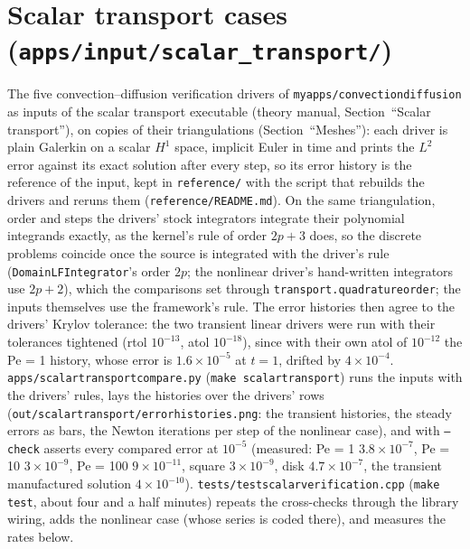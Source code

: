 \documentclass[11pt]{article}
\DeclareRobustCommand{\code}[1]{{\def\_{\textunderscore\allowbreak}\texttt{#1}}}
\DeclareRobustCommand{\file}[1]{{\def\_{\textunderscore\allowbreak}\texttt{#1}}}
\begin{document}
\section{Scalar transport cases (\texttt{apps/input/scalar\_transport/})}
\label{sec:scalarcases}

The five convection--diffusion verification drivers of
\file{myapps/convection\_diffusion} as inputs of the scalar transport
executable (theory manual, Section~``Scalar transport''), on copies of
their triangulations (Section~``Meshes''): each driver is plain Galerkin on
a scalar $H^1$ space, implicit Euler in time and prints the $L^2$ error
against its exact solution after every step, so its error history is the
reference of the input, kept in \file{reference/} with the script that
rebuilds the drivers and reruns them (\file{reference/README.md}).  On the
same triangulation, order and steps the drivers' stock integrators
integrate their polynomial integrands exactly, as the kernel's rule of
order $2p + 3$ does, so the discrete problems coincide once the source is
integrated with the driver's rule (\code{DomainLFIntegrator}'s order $2p$;
the nonlinear driver's hand-written integrators use $2p + 2$), which the
comparisons set through \code{transport.quadrature\_order}; the inputs
themselves use the framework's rule.  The error histories then agree to the
drivers' Krylov tolerance: the two transient linear drivers were run with
their tolerances tightened (rtol $10^{-13}$, atol $10^{-18}$), since with
their own atol of $10^{-12}$ the Pe = 1 history, whose error is
$1.6\times10^{-5}$ at $t = 1$, drifted by $4\times10^{-4}$.
\file{apps/scalar\_transport\_compare.py} (\code{make scalar\_transport})
runs the inputs with the drivers' rules, lays the histories over the
drivers' rows (\file{out/scalar\_transport/error\_histories.png}: the
transient histories, the steady errors as bars, the Newton iterations per
step of the nonlinear case), and with \code{--check} asserts every
compared error at $10^{-5}$ (measured: Pe = 1 $3.8\times10^{-7}$, Pe = 10
$3\times10^{-9}$, Pe = 100 $9\times10^{-11}$, square $3\times10^{-9}$,
disk $4.7\times10^{-7}$, the transient manufactured solution $4\times10^{-10}$).
\file{tests/test\_scalar\_verification.cpp} (\code{make test}, about
four and a half minutes) repeats the cross-checks through the library
wiring, adds the nonlinear case (whose series is coded there), and
measures the rates below.
\end{document}
